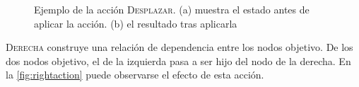 \begin{figure}[ht]
  \centering
  \begin{subfigure}[b]{0.3\textwidth}
    \caption{}
  \end{subfigure}
  \qquad\qquad
  \begin{subfigure}[b]{0.3\textwidth}
    \caption{}
  \end{subfigure}
  \caption{Ejemplo de la acción \textsc{Desplazar}. (a) muestra el
    estado antes de aplicar la acción. (b) el resultado tras
    aplicarla}
  \label{fig:shiftaction}
\end{figure}
\textsc{Derecha} construye una relación de dependencia entre los nodos
objetivo. De los dos nodos objetivo, el de la izquierda pasa a ser hijo
del nodo de la derecha. En la \autoref{fig:rightaction} puede observarse el
efecto de esta acción.
